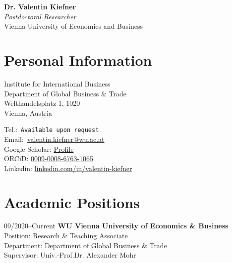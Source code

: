 \documentclass[11pt,a4paper]{article}
\newif\ifPersonalInfo %
\newcommand\phone[1]{\href{tel:#1}{{\emailfont #1}}}
\newcommand\email[1]{\href{mailto:#1}{{\emailfont #1}}}
\newcommand\emailfont{\sffamily}
\begin{document}
\begin{cv}
\begin{center}
{\LARGE\textbf{\color{darkblue}Dr. Valentin Kiefner}}\\[6pt]
{\large \textit{Postdoctoral Researcher}}\\
{\large Vienna University of Economics and Business}\\[12pt]
\end{center}

\section{Personal Information}
  \begin{cvlist}{}
  \item
    Institute for International Business\\
    Department of Global Business \& Trade\\
    Welthandelsplatz 1, 1020\\
    Vienna, Austria

  \item 
    \ifPersonalInfo
        Birth date: 07 March 1994\\
        Place of birth: Hamburg, Germany\\
        Nationality: German\\
    \fi
    \ifPersonalInfo
        Tel.:~\phone{+43~(1)~31336-5771}\\
    \else
        Tel.:~\texttt{Available upon request}\\
    \fi
    Email:~\email{valentin.kiefner@wu.ac.at}\\
    Google Scholar: \href{https://scholar.google.com/citations?user=JwNZJX0AAAAJ&hl=de&oi=ao}{Profile}\\
    ORCiD: \href{https://orcid.org/0009-0008-6763-1065}{0009-0008-6763-1065}\\
    Linkedin: \href{https://linkedin.com/in/valentin-kiefner/}{linkedin.com/in/valentin-kiefner}

  \end{cvlist}
  
\section{Academic Positions}
  \begin{cvlist}{}
    \item[09/2020--Current]
      {\textbf{WU Vienna University of Economics \& Business}}\\
      {Position:} Research \& Teaching Associate\\
      {Department:} Department of Global Business \& Trade\\
      {Supervisor:} {Univ.-Prof.Dr. Alexander Mohr}
        

\end{cvlist}
\end{cv}
\end{document}
